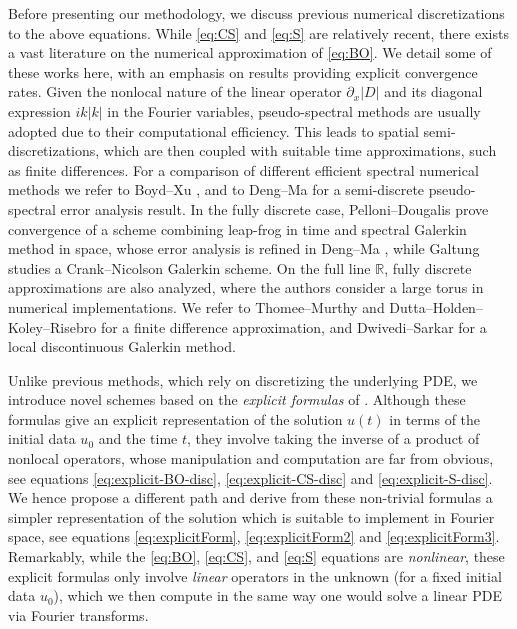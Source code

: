 \documentclass [11pt] {article}
\begin{document}
Before presenting our methodology, we
discuss previous numerical discretizations to the above equations. While \eqref{eq:CS} and \eqref{eq:S} are relatively recent, there exists a vast literature on the numerical approximation of \eqref{eq:BO}. We detail some of these works here, with an emphasis on results providing explicit convergence rates. Given the nonlocal nature of the linear operator $\partial_x|D|$ and its diagonal expression $ik|k|$ in the Fourier variables, pseudo-spectral methods are usually adopted 
due to their computational efficiency.
This leads to spatial semi-discretizations, 
which are then coupled with suitable time approximations, such as finite differences.
For a comparison of different efficient spectral numerical methods we refer to Boyd--Xu \cite{BX11}, and to Deng--Ma \cite{DM09-2} for a semi-discrete pseudo-spectral error analysis result.
  In the fully discrete case, Pelloni--Dougalis
\cite{PD01} prove convergence of a scheme combining leap-frog in time and spectral Galerkin method in space,
whose error analysis is refined in Deng--Ma \cite{DM09},
while Galtung \cite{G16} studies a Crank--Nicolson Galerkin scheme.
On the full line $\mathbb{R}$, fully discrete approximations are also analyzed, where the authors consider a large torus in numerical implementations. We refer to Thomee--Murthy
\cite{T98} and Dutta--Holden--Koley--Risebro \cite{DHK16} for a finite difference approximation, and Dwivedi--Sarkar \cite{DS24} for a local discontinuous Galerkin method. 




Unlike previous methods, which rely on discretizing the underlying PDE, we introduce novel schemes based on the {\it explicit formulas} of \cite{G, Bad24,GG15}. Although these formulas give an explicit representation of the solution $u(t)$ in terms of the initial data $u_0$ and the time $t$, they involve taking the inverse of a product of nonlocal operators, whose manipulation and computation are far from obvious, see equations \eqref{eq:explicit-BO-disc}, \eqref{eq:explicit-CS-disc} and \eqref{eq:explicit-S-disc}. We hence propose a different path and derive from these non-trivial formulas a simpler representation of the solution which is suitable to implement in Fourier space, see equations \eqref{eq:explicitForm}, \eqref{eq:explicitForm2} and \eqref{eq:explicitForm3}. 
Remarkably, while the \eqref{eq:BO}, \eqref{eq:CS}, and  \eqref{eq:S} equations are {\it nonlinear}, these explicit formulas only involve {\it linear} operators in the unknown (for a fixed initial data $u_0$), which we then compute in the same way one would solve a linear PDE via Fourier transforms.
\end{document}
